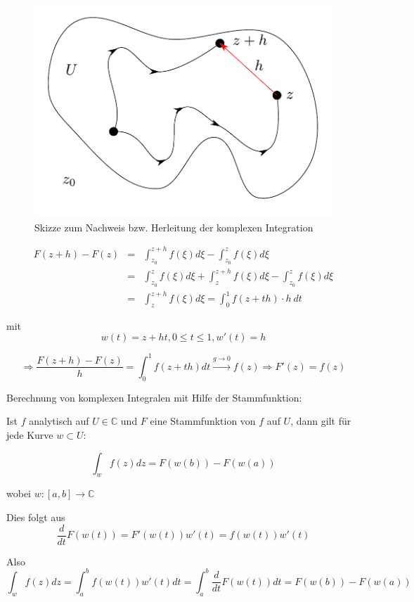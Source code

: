 \documentclass[10pt,a4paper]{article}
\begin{document}
\begin{figure}[H]
\includegraphics[width=\textwidth]{images/komplexe_integration}
\caption{Skizze zum Nachweis bzw. Herleitung der komplexen Integration}
\end{figure}



\begin{eqnarray*}
F(z+h)-F(z) &=& \int_{z_0}^{z+h} f(\xi) d\xi - \int_{z_0}^{z} f(\xi) d\xi \\
&=& \int_{z_0}^{z} f(\xi) d\xi + \int_{z}^{z+h} f(\xi) d\xi - \int_{z_0}^{z} f(\xi) d\xi \\
&=& \int_{z}^{z+h} f(\xi) d\xi = \int_{0}^{1} f(z+th) \cdot h ~ dt
\end{eqnarray*}



mit $$w(t)=z+ht,  0 \leq t \leq 1, w'(t)=h$$


$$\Rightarrow \frac{F(z+h)-F(z)}{h} = \int_{0}^{1} f(z+th) dt \stackrel{g \rightarrow 0}{\rightarrow} f(z) \Rightarrow F'(z)=f(z)$$

Berechnung von komplexen Integralen mit Hilfe der Stammfunktion:

\begin{satz}
Ist $f$ analytisch auf $U \in \mathbb{C}$ und $F$ eine Stammfunktion von $f$ auf $U$, dann gilt für jede Kurve $w \subset U$:

$$\int_w f(z) dz = F(w(b))-F(w(a))$$

wobei $w:[a,b] \rightarrow \mathbb{C}$

Dies folgt aus $$\frac{d}{dt} F(w(t)) = F'(w(t))w'(t) = f(w(t))w'(t)$$

Also $$\int_{w} f(z) dz = \int_{a}^{b} f(w(t))w'(t) dt = \int_{a}^{b} \frac{d}{dt} F(w(t)) dt = F(w(b))-F(w(a))$$
\end{satz}
\end{document}
